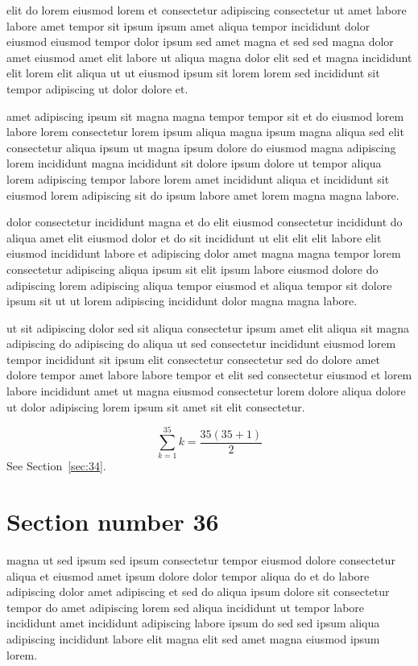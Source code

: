 \documentclass{article}
\begin{document}
elit do lorem eiusmod lorem et consectetur adipiscing consectetur ut amet labore labore amet tempor sit ipsum ipsum amet aliqua tempor incididunt dolor eiusmod eiusmod tempor dolor ipsum sed amet magna et sed sed magna dolor amet eiusmod amet elit labore ut aliqua magna dolor elit sed et magna incididunt elit lorem elit aliqua ut ut eiusmod ipsum sit lorem lorem sed incididunt sit tempor adipiscing ut dolor dolore et.

amet adipiscing ipsum sit magna magna tempor tempor sit et do eiusmod lorem labore lorem consectetur lorem ipsum aliqua magna ipsum magna aliqua sed elit consectetur aliqua ipsum ut magna ipsum dolore do eiusmod magna adipiscing lorem incididunt magna incididunt sit dolore ipsum dolore ut tempor aliqua lorem adipiscing tempor labore lorem amet incididunt aliqua et incididunt sit eiusmod lorem adipiscing sit do ipsum labore amet lorem magna magna labore.

dolor consectetur incididunt magna et do elit eiusmod consectetur incididunt do aliqua amet elit eiusmod dolor et do sit incididunt ut elit elit elit labore elit eiusmod incididunt labore et adipiscing dolor amet magna magna tempor lorem consectetur adipiscing aliqua ipsum sit elit ipsum labore eiusmod dolore do adipiscing lorem adipiscing aliqua tempor eiusmod et aliqua tempor sit dolore ipsum sit ut ut lorem adipiscing incididunt dolor magna magna labore.

ut sit adipiscing dolor sed sit aliqua consectetur ipsum amet elit aliqua sit magna adipiscing do adipiscing do aliqua ut sed consectetur incididunt eiusmod lorem tempor incididunt sit ipsum elit consectetur consectetur sed do dolore amet dolore tempor amet labore labore tempor et elit sed consectetur eiusmod et lorem labore incididunt amet ut magna eiusmod consectetur lorem dolore aliqua dolore ut dolor adipiscing lorem ipsum sit amet sit elit consectetur.

\begin{equation} \sum_{k=1}^{35} k = \frac{35(35+1)}{2} \end{equation}
See Section~\ref{sec:34}.

\section{Section number 36}\label{sec:36}
magna ut sed ipsum sed ipsum consectetur tempor eiusmod dolore consectetur aliqua et eiusmod amet ipsum dolore dolor tempor aliqua do et do labore adipiscing dolor amet adipiscing et sed do aliqua ipsum dolore sit consectetur tempor do amet adipiscing lorem sed aliqua incididunt ut tempor labore incididunt amet incididunt adipiscing labore ipsum do sed sed ipsum aliqua adipiscing incididunt labore elit magna elit sed amet magna eiusmod ipsum lorem.
\end{document}
